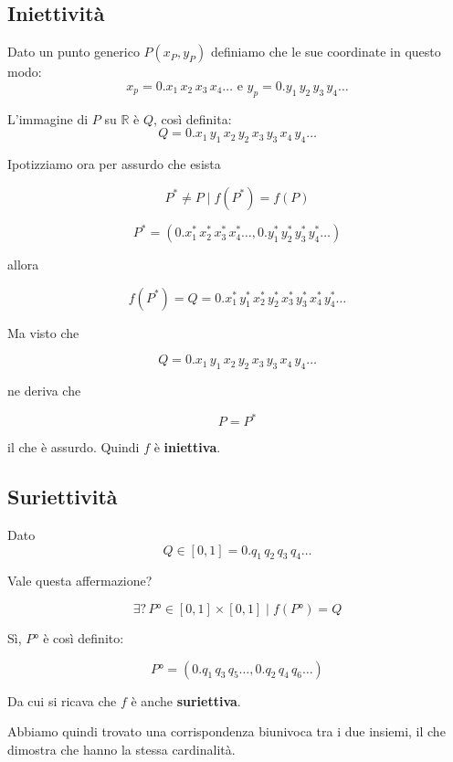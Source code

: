 \documentclass[../../analisi1]{subfiles}
\begin{document}
            \subsection*{Iniettività}

                Dato un punto generico \(P (x_P,y_P) \) definiamo che le sue coordinate in questo modo:
                \[  x_p = 0.x_1 \, x_2 \, x_3 \, x_4 \dots \, \, \text{e} \, \, y_p = 0.y_1 \, y_2 \, y_3 \, y_ 4 \dots \]

                L'immagine di \(P\) su \( \mathbb{R} \) è \( Q \), così definita:
                \[   Q = 0.x_1 \, y_1 \, x_2 \, y_2 \, x_3 \, y_3 \, x_4 \, y_ 4 \dots    \]

                Ipotizziamo ora per assurdo che esista 

                \[    P^* \neq P \mid f(P^*) = f(P) \]

                \[    P^* = (0.x^*_1 \, x^*_2 \, x^*_3 \, x^*_4 \dots , 0.y^*_1 \, y^*_2 \, y^*_3 \, y^*_4 \dots) \]

                allora

                \[    f(P^*) = Q = 0.x^*_1 \, y^*_1 \, x^*_2 \, y^*_2 \, x^*_3 \, y^*_3 \, x^*_4 \, y^*_4 \dots \]

                Ma visto che

                \[ Q = 0.x_1 \, y_1 \, x_2 \, y_2 \, x_3 \, y_3 \, x_4 \, y_ 4 \dots \]

                ne deriva che

                \[P = P^*\]

                il che è assurdo. Quindi \(f\) è \textbf{iniettiva}.

            \subsection*{Suriettività}

                Dato
                \[    Q \in [0,1] = 0.q_1 \, q_2 \, q_3 \, q_4 \dots    \]

                Vale questa affermazione?

                \[    \exists \text{?} \, P° \in [0,1] \times [0,1] \mid f(P°) = Q    \]

                Sì, \(P°\) è così definito:

                \[    P° = (0.q_1 \, q_3 \, q_5 \dots, 0.q_2 \, q_4 \, q_6 \dots)    \]

                Da cui si ricava che \(f\) è anche \textbf{suriettiva}.

                \bigskip

                Abbiamo quindi trovato una corrispondenza biunivoca tra i due insiemi, il che dimostra che hanno la stessa cardinalità.
            
\end{document}
